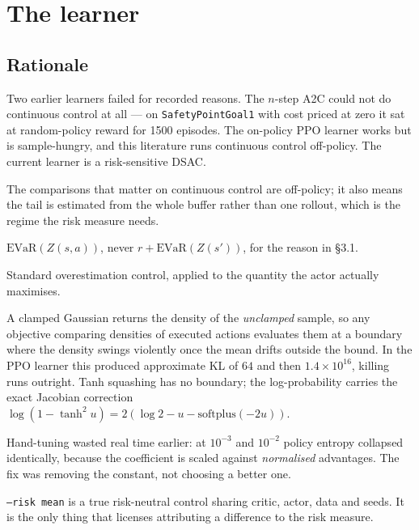 \documentclass[11pt,a4paper]{article}
\newcommand{\evar}{\mathrm{EVaR}}
\begin{document}
\section{The learner}

\subsection{Rationale}

Two earlier learners failed for recorded reasons. The $n$-step A2C could not do
continuous control at all --- on \texttt{SafetyPointGoal1} with cost priced at zero
it sat at random-policy reward for 1500 episodes. The on-policy PPO learner works
but is sample-hungry, and this literature runs continuous control off-policy. The
current learner is a risk-sensitive DSAC.

\begin{description}[leftmargin=1.2em,itemsep=0.25em]
\item[Off-policy with replay.] The comparisons that matter on continuous control
  are off-policy; it also means the tail is estimated from the whole buffer rather
  than one rollout, which is the regime the risk measure needs.
\item[IQN action-value critic.] $\evar(Z(s,a))$, never $r + \evar(Z(s'))$, for the
  reason in \S3.1.
\item[Twin critics, minimum over the \emph{risk} value.] Standard overestimation
  control, applied to the quantity the actor actually maximises.
\item[Tanh-squashed actor.] A clamped Gaussian returns the density of the
  \emph{unclamped} sample, so any objective comparing densities of executed actions
  evaluates them at a boundary where the density swings violently once the mean
  drifts outside the bound. In the PPO learner this produced approximate KL of
  $64$ and then $1.4\times10^{16}$, killing runs outright. Tanh squashing has no
  boundary; the log-probability carries the exact Jacobian correction
  $\log(1-\tanh^2 u) = 2(\log 2 - u - \mathrm{softplus}(-2u))$.
\item[Automatic entropy temperature.] Hand-tuning wasted real time earlier: at
  $10^{-3}$ and $10^{-2}$ policy entropy collapsed identically, because the
  coefficient is scaled against \emph{normalised} advantages. The fix was removing
  the constant, not choosing a better one.
\item[Pluggable risk functional.] \texttt{--risk mean} is a true risk-neutral
  control sharing critic, actor, data and seeds. It is the only thing that licenses
  attributing a difference to the risk measure.
\end{description}
\end{document}
